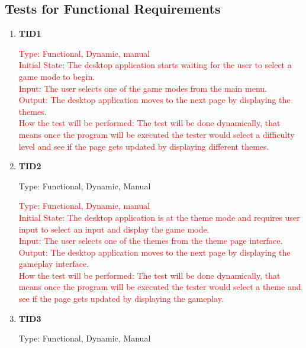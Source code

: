 \documentclass[12pt, titlepage]{article}
\begin{document}
\subsection{Tests for Functional Requirements}
		
\begin{enumerate}

\subsubsection{Testing Functions \& Methods}
\item{\textbf{TID1}\\}

\textcolor{red} {Type: Functional, Dynamic, manual\\
Initial State: The desktop application starts waiting for the user to select a game mode to begin.\\
Input: The user selects one of the game modes from the main menu.\\
Output: The desktop application moves to the next page by displaying the themes.\\
How the test will be performed: The test will be done dynamically, that means once the program will be executed the tester would select a difficulty level and see if the page gets updated by displaying different themes.}

\item{\textbf{TID2}\\}

Type: Functional, Dynamic, Manual
					
\textcolor{red} {Type: Functional, Dynamic, manual\\
Initial State: The desktop application is at the theme mode and requires user input to select an input and display the game mode.\\
Input: The user selects one of the themes from the theme page interface.\\
Output: The desktop application moves to the next page by displaying the gameplay interface.\\
How the test will be performed: The test will be done dynamically, that means once the program will be executed the tester would select a theme and see if the page gets updated by displaying the gameplay.}


\item{\textbf{TID3}\\}

Type: Functional, Dynamic, Manual
					

\end{enumerate}
\end{document}
